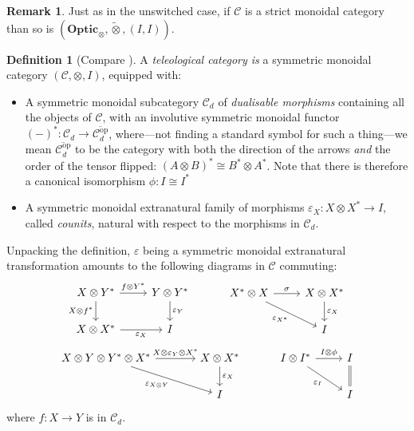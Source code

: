\documentclass[11pt,letterpaper]{article}
\theoremstyle{plain}
\theoremstyle{definition}
\newtheorem{definition}[theorem]{Definition}
\newtheorem{remark}[theorem]{Remark}
\newcommand{\C}{\mathscr{C}}
\newcommand{\Optic}{\mathbf{Optic}}
\newcommand{\switched}{\mathbin{\tilde{\otimes}}}
\newcommand{\op}{\mathrm{op}}
\begin{document}
\begin{remark}
  Just as in the unswitched case, if $\C$ is a strict monoidal category than so is $(\Optic_\otimes, \switched, (I, I))$.
\end{remark}

\begin{definition}[Compare {\cite[Definition 5.1]{CoherenceForLenses}}]
  A \emph{teleological category is} a symmetric monoidal category $(\C, \otimes, I)$, equipped with:
  \begin{itemize}
  \item A symmetric monoidal subcategory $\C_d$ of \emph{dualisable morphisms} containing all the objects of $\C$, with an involutive symmetric monoidal functor ${(-)}^* : \C_d \to \overline{\C_d^\op}$, where---not finding a standard symbol for such a thing---we mean $\overline{\C_d^\op}$ to be the category with both the direction of the arrows \emph{and} the order of the tensor flipped: ${(A \otimes B)}^* \cong B^* \otimes A^*$. Note that there is therefore a canonical isomorphism $\phi : I \cong I^*$
  \item A symmetric monoidal extranatural family of morphisms $\varepsilon_X : X \otimes X^* \to I$, called \emph{counits}, natural with respect to the morphisms in $\C_d$.
  \end{itemize}
\end{definition}
Unpacking the definition, $\varepsilon$ being a symmetric monoidal extranatural transformation amounts to the following diagrams in $\C$ commuting:
\[
  \begin{tikzcd}
    X \otimes Y^* \ar[r, "f \otimes Y^*"]  \ar[d, "X \otimes f^*", swap] & Y \otimes Y^* \ar[d, "\varepsilon_Y"] \\
    X \otimes X^* \ar[r, "\varepsilon_X", swap] & I
  \end{tikzcd} \hspace{1cm}
  \begin{tikzcd}
    X^* \otimes X \ar[r, "\sigma"]  \ar[dr, "\varepsilon_{X^*}", swap] & X \otimes X^* \ar[d, "\varepsilon_X"] \\
    & I
  \end{tikzcd}\]
\[
  \begin{tikzcd}[column sep = large]
    X \otimes Y \otimes Y^* \otimes X^* \ar[r, "X \otimes \varepsilon_Y \otimes X^*"]  \ar[dr, "\varepsilon_{X \otimes Y}", swap] & X \otimes X^* \ar[d, "\varepsilon_X"] \\
    & I
  \end{tikzcd} \hspace{1cm}
  \begin{tikzcd}
    I \otimes I^* \ar[r,"I \otimes \phi"] \ar[dr, swap, "\varepsilon_I"] & I \ar[d, equal] \\
    & I
  \end{tikzcd}
\]
where $f : X \to Y$ is in $\C_d$.
\end{document}
